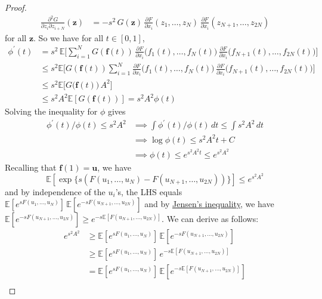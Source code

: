 \begin{proof}
\begin{align*}
      \frac{\partial^2 G}{\partial z_i \partial z_{i + N}} (\mathbf{z}) & = - s^2 \, G(\mathbf{z}) \, \frac{\partial F}{\partial x_i} (z_1, \ldots, z_N) \, \frac{\partial F}{\partial x_i} (z_{N+1}, \ldots, z_{2N}) 
  \end{align*}
  for all $\mathbf{z}$. So we have for all $t \in [0, 1]$, 
  \begin{align*}
      \phi^\prime (t) & = s^2 \, \mathbb{E} \bigg[ \sum_{i=1}^N G(\mathbf{f}(t)) \, \frac{\partial F}{\partial x_i} \big( f_1 (t), \ldots, f_N (t) \big) \, \frac{\partial F}{\partial x_i} \big( f_{N+1} (t), \ldots, f_{2N} (t) \big) \bigg] \\ 
      & \leq s^2 \mathbb{E} \bigg[ G(\mathbf{f}(t)) \sum_{i=1}^N \frac{\partial F}{\partial x_i} \big( f_1 (t), \ldots, f_N (t) \big) \, \frac{\partial F}{\partial x_i} \big( f_{N+1} (t), \ldots, f_{2N} (t) \big) \bigg] \\ 
      & \leq s^2 \mathbb{E} \big[ G(\mathbf{f}(t) \big) \, A^2 \big] \\
      & \leq s^2 A^2 \mathbb{E}[G(\mathbf{f}(t))] = s^2 A^2 \phi(t)
  \end{align*}
  Solving the inequality for $\phi$ gives 
  \begin{align*}
      \phi^\prime (t) / \phi(t) \leq s^2 A^2 & \implies \int \phi^\prime (t) / \phi(t) \,dt \leq \int s^2 A^2 \,dt \\
      & \implies \log{\phi(t)} \leq s^2 A^2 t + C \\
      & \implies \phi(t) \leq e^{s^2 A^2 t} \leq e^{s^2 A^2}
  \end{align*}
  Recalling that $\mathbf{f}(1) = \mathbf{u}$, we have 
  \begin{equation}
    \mathbb{E}[\exp\{ s ( F(u_1, \ldots, u_N) - F(u_{N+1}, \ldots, u_{2N})) \}] \leq e^{s^2 A^2}
  \end{equation}
  and by independence of the $u_i$'s, the LHS equals $\mathbb{E}[e^{s F(u_1, \ldots, u_N)}]\, \mathbb{E}[e^{-s F(u_{N+1}, \ldots, u_{2N})}]$ and by \hyperref[thm:jensens-inequality]{Jensen's inequality}, we have $\mathbb{E}[e^{-s F(u_{N+1}, \ldots, u_{2N})}] \geq e^{-s \mathbb{E}[F(u_{N+1}, \ldots, u_{2N})]}$. We can derive as follows: 
  \begin{align*}
      e^{s^2 A^2} & \geq \mathbb{E}[e^{s F(u_1, \ldots, u_N)}]\, \mathbb{E}[e^{-s F(u_{N+1}, \ldots, u_{2N})}] \\
      & \geq \mathbb{E}[e^{s F(u_1, \ldots, u_N)}]\, e^{-s \mathbb{E}[F(u_{N+1}, \ldots, u_{2N})]} \\
      & = \mathbb{E}[e^{s F(u_1, \ldots, u_N)}]\, \mathbb{E}[e^{-s \mathbb{E}[F(u_{N+1}, \ldots, u_{2N})]}] \\

\end{align*}
\end{proof}

